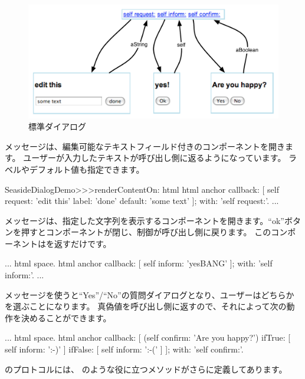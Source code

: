 \documentclass[a4paper,10pt,twoside]{book}
\begin{document}
\begin{figure}[b]
\begin{center}
\includegraphics[width=\textwidth]{dialogs}
\caption{標準ダイアログ}
\end{center}
\end{figure}

メッセージは、編集可能なテキストフィールド付きのコンポーネントを開きます。
ユーザーが入力したテキストが呼び出し側に返るようになっています。
ラベルやデフォルト値も指定できます。

\begin{code}{}
SeasideDialogDemo>>>renderContentOn: html
	html anchor
		callback: [ self request: 'edit this' label: 'done' default: 'some text' ];
		with: 'self request:'.
...
\end{code}

メッセージは、指定した文字列を表示するコンポーネントを開きます。``ok''ボタンを押すとコンポーネントが閉じ、制御が呼び出し側に戻ります。
このコンポーネントはを返すだけです。

\begin{code}{}
...
	html space.
	html anchor
		callback: [ self inform: 'yesBANG' ];
		with: 'self inform:'.
...
\end{code}

メッセージを使うと``Yes''/``No''の質問ダイアログとなり、ユーザーはどちらかを選ぶことになります。
真偽値を呼び出し側に返すので、それによって次の動作を決めることができます。

\begin{code}{}
...
	html space.
	html anchor
		callback: [
			(self confirm: 'Are you happy?')
				ifTrue: [ self inform: ':-)' ]
				ifFalse: [ self inform: ':-(' ]
			];
		with: 'self confirm:'.
\end{code}

のプロトコルには、 のような役に立つメソッドがさらに定義してあります。
\end{document}
